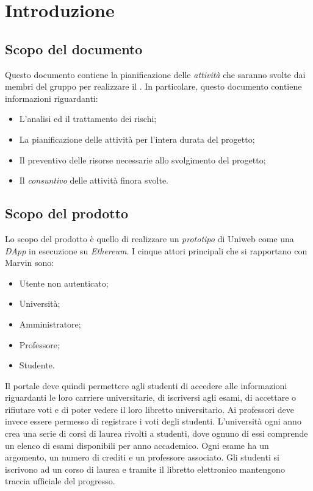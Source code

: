 \newpage
\section{Introduzione}
\subsection{Scopo del documento}
Questo documento contiene la pianificazione delle \emph{attività} che saranno svolte dai membri del gruppo \Gruppo{} per realizzare il \NomeProgetto. In particolare, questo documento contiene informazioni riguardanti:

\begin{itemize}
	\item L'analisi ed il trattamento dei rischi;
	\item La pianificazione delle attività per l'intera durata del progetto;
	\item Il preventivo delle risorse necessarie allo svolgimento del progetto;
	\item Il \emph{consuntivo} delle attività finora svolte.
\end{itemize}

\subsection{Scopo del prodotto}
Lo scopo del prodotto è quello di realizzare un \emph{prototipo} di Uniweb come una \emph{ÐApp} in esecuzione su \emph{Ethereum}. I cinque attori principali che si rapportano con Marvin sono:
\begin{itemize}
	\item Utente non autenticato; 
	\item Università;
	\item Amministratore;
	\item Professore;
	\item Studente.
\end{itemize} 
Il portale deve quindi permettere agli studenti di accedere alle informazioni riguardanti le loro carriere universitarie, di iscriversi agli esami, di accettare o rifiutare voti e di poter vedere il loro libretto universitario.
Ai professori deve invece essere permesso di registrare i voti degli studenti.
L'università ogni anno crea una serie di corsi di laurea rivolti a studenti, dove ognuno di essi comprende un elenco di esami disponibili per anno accademico. Ogni esame ha un argomento, un numero di crediti e un professore associato. Gli studenti si iscrivono ad un corso di laurea e tramite il libretto elettronico mantengono traccia ufficiale del progresso.

